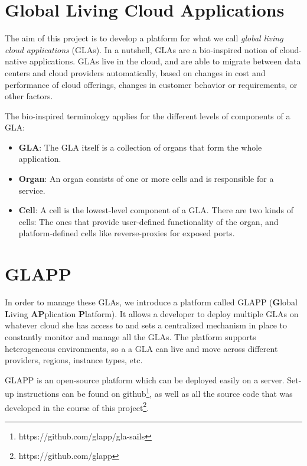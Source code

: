 \documentclass{seal_thesis}
\begin{document}
\section{Global Living Cloud Applications}

The aim of this project is to develop a platform for what we call \textit{global living cloud applications} (GLAs).
In a nutshell, GLAs are a bio-inspired notion of cloud-native applications.
GLAs live in the cloud, and are able to migrate between data centers and cloud providers automatically, based on changes in cost and performance of cloud offerings, changes in customer behavior or requirements, or other factors.

The bio-inspired terminology applies for the different levels of components of a GLA:

\begin{itemize}
	\item \textbf{GLA}: The GLA itself is a collection of organs that form the whole application.
	\item \textbf{Organ}: An organ consists of one or more cells and is responsible for a service.
	\item \textbf{Cell}: A cell is the lowest-level component of a GLA.
	There are two kinds of cells: The ones that provide user-defined functionality of the organ, and platform-defined cells like reverse-proxies for exposed ports.
\end{itemize}


\section{GLAPP}

In order to manage these GLAs, we introduce a platform called GLAPP (\textbf{G}lobal \textbf{L}iving \textbf{AP}plication \textbf{P}latform).
It allows a developer to deploy multiple GLAs on whatever cloud she has access to and sets a centralized mechanism in place to constantly monitor and manage all the GLAs.
The platform supports heterogeneous environments, so a a GLA can live and move across different providers, regions, instance types, etc.

GLAPP is an open-source platform which can be deployed easily on a server. Set-up instructions can be found on github\footnote{https://github.com/glapp/gla-sails}, as well as all the source code that was developed in the course of this project\footnote{https://github.com/glapp}.
\end{document}
